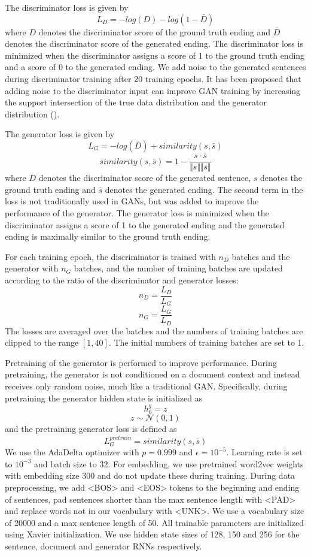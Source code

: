 \documentclass{article}
\begin{document}
The discriminator loss is given by
$$ L_{D} = -log(D) - log(1-\bar{D})$$
where $D$ denotes the discriminator score of the ground truth ending and $\bar{D}$ denotes the discriminator score of the generated ending. The discriminator loss is minimized when the discriminator assigns a score of 1 to the ground truth ending and a score of 0 to the generated ending.
We add noise to the generated sentences during discriminator training after 20 training epochs. It has been proposed that adding noise to the discriminator input can improve GAN training by increasing the support intersection of the true data distribution and the generator distribution (\cite{2017ariv170104862A}).

The generator loss is given by
$$ L_{G} = -log(\bar{D}) + similarity(s, \bar{s}) $$
$$ similarity(s, \bar{s}) = 1 - \frac{s \cdot \bar{s}}{\Vert s \Vert \Vert \bar{s} \Vert} $$
where $\bar{D}$ denotes the discriminator score of the generated sentence, $s$ denotes the ground truth ending and $\bar{s}$ denotes the generated ending. The second term in the loss is not traditionally used in GANs, but was added to improve the performance of the generator. The generator loss is minimized when the discriminator assigns a score of 1 to the generated ending and the generated ending is maximally similar to the ground truth ending.

For each training epoch, the discriminator is trained with $n_{D}$ batches and the generator with $n_{G}$ batches, and the number of training batches are updated according to the ratio of the discriminator and generator losses:
$$ n_{D} = \frac{L_{D}}{L_{G}} $$ 
$$ n_{G} = \frac{L_{G}}{L_{D}} $$
The losses are averaged over the batches and the numbers of training batches are clipped to the range $[1,40]$. The initial numbers of training batches are set to 1.

Pretraining of the generator is performed to improve performance. During pretraining, the generator is not conditioned on a document context and instead receives only random noise, much like a traditional GAN. Specifically, during pretraining the generator hidden state is initialized as
$$ h^{g}_{0} = z $$
$$ z \sim \mathcal{N}(0,1) $$
and the pretraining generator loss is defined as
$$ L_{G}^{pretrain} = similarity(s, \bar{s}) $$
We use the AdaDelta optimizer with $p=0.999$ and $\epsilon=10^{-5}$. Learning rate is set to $10^{-3}$ and batch size to 32. For embedding, we use pretrained word2vec weights with embedding size 300 and do not update these during training. During data preprocessing, we add <BOS> and <EOS> tokens to the beginning and ending of sentences, pad sentences shorter than the max sentence length with <PAD> and replace words not in our vocabulary with <UNK>. We use a vocabulary size of 20000 and a max sentence length of 50. All trainable parameters are initialized using Xavier initialization. We use hidden state sizes of 128, 150 and 256 for the sentence, document and generator RNNs respectively.
\end{document}
